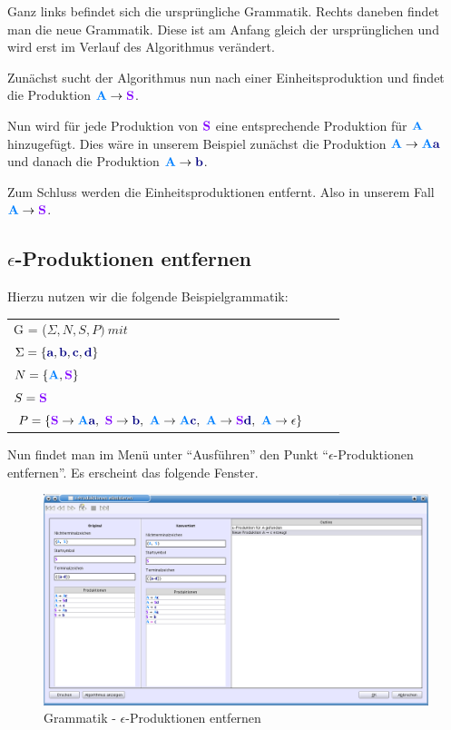 Ganz links befindet sich die ursprüngliche Grammatik. Rechts daneben findet man die neue Grammatik. Diese ist am Anfang gleich der ursprünglichen und wird erst im Verlauf des Algorithmus verändert.

Zunächst sucht der Algorithmus nun nach einer Einheitsproduktion und findet die Produktion $\NonterminalSymbol{A} \to \StartSymbol{S}$.

Nun wird für jede Produktion von $\StartSymbol{S}$ eine entsprechende Produktion für $\NonterminalSymbol{A}$ hinzugefügt. Dies wäre in unserem Beispiel zunächst die Produktion $\NonterminalSymbol{A} \to \NonterminalSymbol{A}\TerminalSymbol{a}$ und danach die Produktion $\NonterminalSymbol{A} \to \TerminalSymbol{b}$.

Zum Schluss werden die Einheitsproduktionen entfernt. Also in unserem Fall $\NonterminalSymbol{A} \to \StartSymbol{S}$.

\subsection{$\epsilon$-Produktionen entfernen}

Hierzu nutzen wir die folgende Beispielgrammatik:

\begin{tabular}{lcr}
G = ($\Sigma, N, S, P )\ mit $\\
$\Sigma = \{\TerminalSymbol{a}, \TerminalSymbol{b}, \TerminalSymbol{c},
\TerminalSymbol{d}\}$\\ $N =
\{\NonterminalSymbol{A}, \StartSymbol{S}\}$\\ $S=\StartSymbol{S}$\\
$P = \{\StartSymbol{S} \to \NonterminalSymbol{A}\TerminalSymbol{a},\ \StartSymbol{S} \to \TerminalSymbol{b},\
\NonterminalSymbol{A}	\to \NonterminalSymbol{A}\TerminalSymbol{c},\ \NonterminalSymbol{A} \to \StartSymbol{S}\TerminalSymbol{d},\
\NonterminalSymbol{A} \to \epsilon\}$\\
\end{tabular}

Nun findet man im Menü unter "`Ausführen"' den Punkt "`$\epsilon$-Produktionen entfernen"'. Es erscheint das folgende Fenster.

\begin{figure}[h]
\begin{center}
\includegraphics[width=12cm]{../images/epsilon_productions.png}
\caption{Grammatik - $\epsilon$-Produktionen entfernen}
\end{center}
\end{figure}

